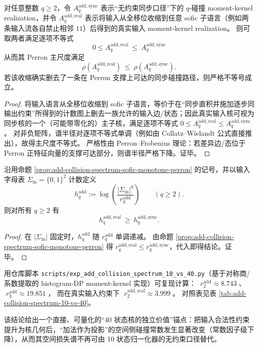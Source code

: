 \begin{proposition}[输入合法性约束对碰撞主尺度的单调压缩]\label{prop:add-collision-spectrum-sofic-monotone-perron}
对任意整数 \(q\ge 2\)，令 \(A_q^{\mathrm{add,sync}}\) 表示“无约束同步口径”下的 \(q\)-碰撞 moment-kernel realization，并令 \(A_q^{\mathrm{add,real}}\) 表示将输入从全移位收缩到任意 sofic 子语言（例如两条输入流各自禁止相邻 \(11\)）后得到的真实输入 moment-kernel realization。
则可取两者满足逐项不等式
\[
0\le A_q^{\mathrm{add,real}}\ \le\ A_q^{\mathrm{add,sync}}
\]
从而其 Perron 主尺度满足
\[
\rho\!\left(A_q^{\mathrm{add,real}}\right)\ \le\ \rho\!\left(A_q^{\mathrm{add,sync}}\right).
\]
若该收缩确实删去了一条在 Perron 支撑上可达的同步碰撞路径，则严格不等号成立。
\end{proposition}
\begin{proof}
将输入语言从全移位收缩到 sofic 子语言，等价于在“同步直积并施加逐步同输出约束”所得到的计数图上删去一族允许的输入边/状态；因此真实输入核可视为同步核的一个（可能带零化的）主子核，满足逐项不等式 \(0\le A^{\mathrm{add,real}}_q\le A^{\mathrm{add,sync}}_q\)。
对非负矩阵，谱半径对逐项不等式单调（例如由 Collatz--Wielandt 公式直接推出），故得主尺度不等式。
严格性由 Perron--Frobenius 理论：若差异边/态位于 Perron 正特征向量的支撑可达部分，则谱半径严格下降。证毕。
\end{proof}

\begin{corollary}\label{cor:add-collision-spectrum-renyi-monotone}
沿用命题 \ref{prop:add-collision-spectrum-sofic-monotone-perron} 的记号，并以输入字母表 \(\Sigma_{\mathrm{in}}=\{0,1\}^2\) 计数定义
\[
h_q^{\mathrm{add}}:=\log\!\left(\frac{|\Sigma_{\mathrm{in}}|^{q}}{r_q^{\mathrm{add}}}\right)
\qquad (q\ge 2).
\]
则对所有 \(q\ge 2\) 有
\[
h_q^{\mathrm{add,real}}\ \ge\ h_q^{\mathrm{add,sync}}.
\]
\end{corollary}
\begin{proof}
在 \(|\Sigma_{\mathrm{in}}|\) 固定时，\(h_q^{\mathrm{add}}\) 随 \(r_q^{\mathrm{add}}\) 单调递减。
由命题 \ref{prop:add-collision-spectrum-sofic-monotone-perron} 得 \(r_q^{\mathrm{add,real}}\le r_q^{\mathrm{add,sync}}\)，代入即得结论。证毕。
\end{proof}

\begin{remark}\label{rem:add-collision-spectrum-10-vs-40}
用仓库脚本 \texttt{scripts/exp\_add\_collision\_spectrum\_10\_vs\_40.py}（基于对称商/系数提取的 histogram-DP moment-kernel 实现）可复现计算：
\(\;r^{\mathrm{add}}_2\approx 8.743\;\)、
\(\;r^{\mathrm{add}}_3\approx 19.851\;\)，
而在真实输入约束下
\(\;r^{\mathrm{add,real}}_2\approx 3.999\;\)。
对照表见表 \ref{tab:add-collision-spectrum-10-vs-40}。


该结论给出一个直接、可量化的“40 状态核的独立价值”锚点：把输入合法性约束提升为核几何后，“加法作为投影”的空间侧碰撞常数发生显著改变（常数因子级下降），从而其空间损失谱不再可由 10 状态归一化器的无约束口径替代。
\end{remark}
